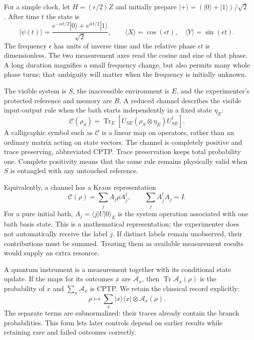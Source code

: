 \documentclass[11pt,a4paper]{article}
\numberwithin{equation}{section}
\theoremstyle{remark}
\DeclareMathOperator{\Tr}{Tr}
\begin{document}
For a simple clock, let $H=(\epsilon/2)Z$ and initially prepare
$|+\rangle=(|0\rangle+|1\rangle)/\sqrt2$. After time $t$ the state is
\begin{equation}
 |\psi(t)\rangle
 =\frac{e^{-i\epsilon t/2}|0\rangle+
             e^{i\epsilon t/2}|1\rangle}{\sqrt2},
 \qquad
 \langle X\rangle=\cos(\epsilon t),\quad
 \langle Y\rangle=\sin(\epsilon t).
 \label{eq:qubit-clock}
\end{equation}
The frequency $\epsilon$ has units of inverse time and the relative
phase $\epsilon t$ is dimensionless. The two measurement axes read
the cosine and sine of that phase. A long duration magnifies a small
frequency change, but also permits many whole phase turns; that ambiguity
will matter when the frequency is initially unknown.

The visible system is $S$, the inaccessible environment is $E$, and the
experimenter's protected reference and memory are $R$. A reduced channel
describes the visible input-output rule when the bath starts independently
in a fixed state $\eta_E$:
\begin{equation}
 \mathcal C(\rho_S)=\Tr_E\!\left[
 U_{SE}(\rho_S\otimes\eta_E)U_{SE}^\dagger\right].
\end{equation}
A calligraphic symbol such as $\mathcal C$ is a linear map on operators,
rather than an ordinary matrix acting on state vectors. The channel is
completely positive and trace preserving, abbreviated CPTP. Trace preservation
keeps total probability one. Complete positivity means that the same rule
remains physically valid when $S$ is entangled with any untouched reference.

Equivalently, a channel has a Kraus representation
\begin{equation}
 \mathcal C(\rho)=\sum_j A_j\rho A_j^\dagger,
 \qquad \sum_j A_j^\dagger A_j=I.
\end{equation}
For a pure initial bath, $A_j=\langle j|U|0\rangle_E$ is the system operation
associated with one bath basis state. This is a mathematical representation;
the experimenter does not automatically receive the label $j$. If distinct
labels remain unobserved, their contributions must be summed. Treating them
as available measurement results would supply an extra resource.

A quantum instrument is a measurement together with its conditional state
update. If the maps for its outcomes $x$ are $\mathcal A_x$, then
$\Tr\mathcal A_x(\rho)$ is the probability of $x$ and
$\sum_x\mathcal A_x$ is CPTP. We retain the classical record explicitly:
\begin{equation}
 \rho\longmapsto\sum_x|x\rangle\langle x|\otimes\mathcal A_x(\rho).
\end{equation}
The separate terms are subnormalized: their traces already contain the
branch probabilities. This form lets later controls depend on earlier
results while retaining rare and failed outcomes correctly.
\end{document}

